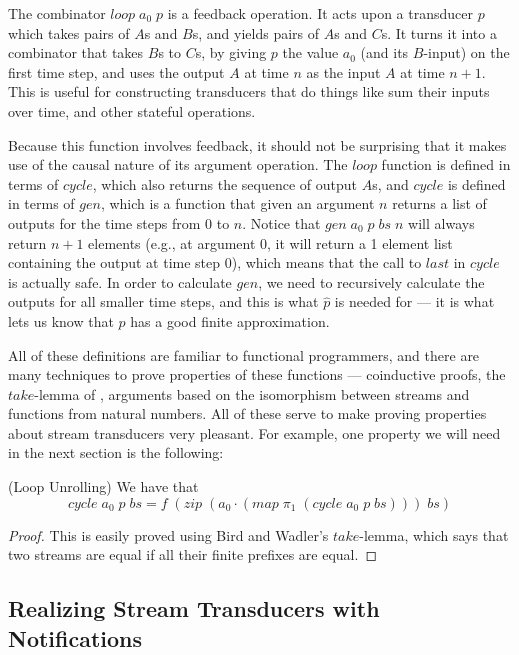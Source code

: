 \documentclass[preprint,natbib]{sigplanconf}
\begin{document}
The combinator $loop\;a_0\;p$ is a feedback operation. It acts
upon a transducer $p$ which takes pairs of $A$s and $B$s, and yields
pairs of $A$s and $C$s. It turns it into a combinator that takes $B$s
to $C$s, by giving $p$ the value $a_0$ (and its $B$-input) on the
first time step, and uses the output $A$ at time $n$ as the input $A$
at time $n+1$. This is useful for constructing transducers that do
things like sum their inputs over time, and other stateful operations. 

Because this function involves feedback, it should not be surprising
that it makes use of the causal nature of its argument operation. The
$loop$ function is defined in terms of $cycle$, which also returns the
sequence of output $A$s, and $cycle$ is defined in terms of $gen$,
which is a function that given an argument $n$ returns a list of
outputs for the time steps from $0$ to $n$. Notice that
$gen\;a_0\;p\;bs\;n$ will always return $n+1$ elements (e.g., at
argument 0, it will return a 1 element list containing the output at
time step 0), which means that the call to $last$ in $cycle$ is
actually safe. In order to calculate $gen$, we need to recursively
calculate the outputs for all smaller time steps, and this is what
$\hat{p}$ is needed for --- it is what lets us know that $p$ has a good
finite approximation.

All of these definitions are familiar to functional programmers, and
there are many techniques to prove properties of these functions ---
coinductive proofs, the $take$-lemma of \citet{bird-wadler}, arguments based on
the isomorphism between streams and functions from natural
numbers. All of these serve to make proving properties about stream
transducers very pleasant. For example, one property we will need in
the next section is the following:

\begin{lemma}{(Loop Unrolling)} We have that 
  \begin{displaymath}
    cycle\;a_0\;p\;bs = f\;(zip\;(a_0\cdot(map\;\pi_1\;(cycle\;a_0\;p\;bs)))\;bs)
  \end{displaymath}
\end{lemma}

\begin{proof}
  This is easily proved using Bird and Wadler's $take$-lemma, which
  says that two streams are equal if all their finite prefixes are
  equal.
\end{proof}


\subsection{Realizing Stream Transducers with Notifications}
\end{document}
